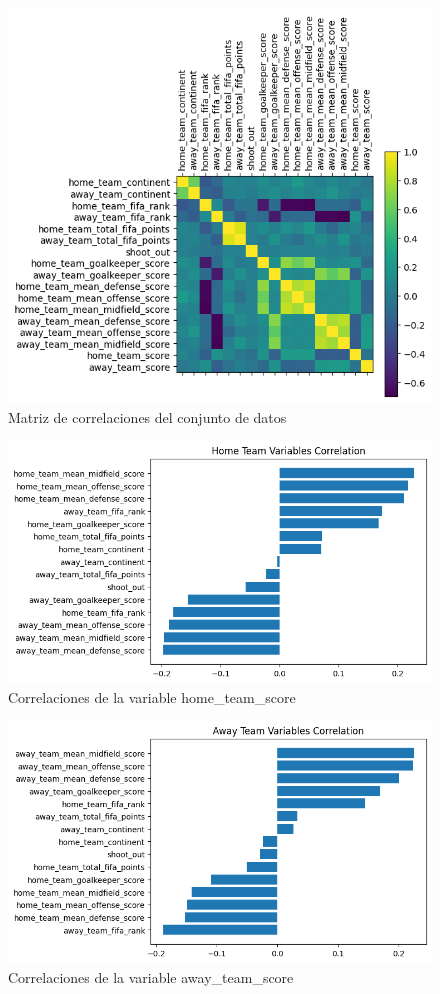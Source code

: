 \begin{figure}[H]
    \centering
    \includegraphics[width=\textwidth]{images/correlationMatrix.png}
    \caption{Matriz de correlaciones del conjunto de datos}
    \label{Conjunto-Datos-Matriz-Correlaciones}
\end{figure}

\begin{figure}[H]
    \centering
    \includegraphics[width=\textwidth]{images/homeTeamCorrelation.png}
    \caption{Correlaciones de la variable home\_team\_score}
    \label{Conjunto-Datos-Matriz-Correlaciones}
\end{figure}

\begin{figure}[H]
    \centering
    \includegraphics[width=\textwidth]{images/awayTeamCorrelation.png}
    \caption{Correlaciones de la variable away\_team\_score}
    \label{Conjunto-Datos-Matriz-Correlaciones}
\end{figure}

\newpage